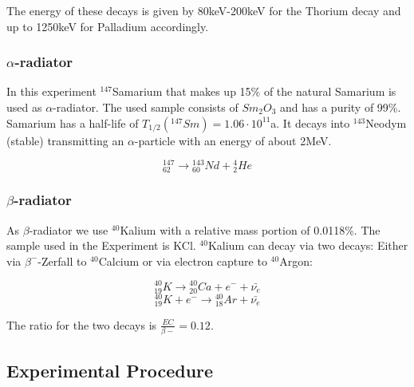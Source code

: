 \documentclass[12pt]{article}
\begin{document}
The energy of these decays is given by 80keV-200keV for the Thorium decay and up to 1250keV for Palladium accordingly.


\subsubsection{$\alpha$-radiator}

In this experiment ${}^{147}$Samarium that makes up 15\% of the natural Samarium is used as $\alpha$-radiator. The used sample consists of $Sm_2O_3$ and has a purity of 99\%. Samarium has a half-life of  $T_{1/2}({}^{147}Sm)=1.06\cdot10^{11}$a. It decays into ${}^{143}$Neodym (stable) transmitting an $\alpha$-particle with an energy of about 2MeV.

\[{}^{147}_{62} \rightarrow {}^{143}_{60}Nd + {}^4_2He\]

\subsubsection{$\beta$-radiator}
As $\beta$-radiator we use ${}^{40}$Kalium with a relative  mass portion of 0.0118\%. The sample used in the Experiment is KCl. 
${}^{40}$Kalium can decay via two decays: Either via $\beta^-$-Zerfall to ${}^{40}$Calcium or via electron capture to ${}^{40}$Argon:

\[{}^{40}_{19}K \rightarrow {}^{40}_{20}Ca + e^- + \bar{\nu_e}\]
\[{}^{40}_{19}K + e^- \rightarrow {}^{40}_{18}Ar + \bar{\nu_e}\]

The ratio for the two decays is $\frac{EC}{\beta-}=0.12$.\\

\subsection{Experimental Procedure}
\end{document}
